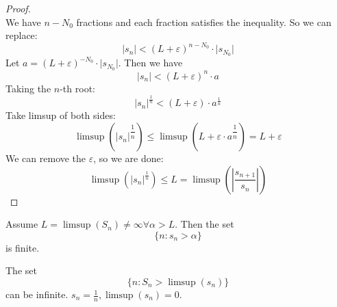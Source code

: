 \documentclass{report}
\begin{document}
\begin{proof}
\begin{equation*}
            \end{equation*}
        We have $n - N_{0}$ fractions and each fraction satisfies the inequality. So we can replace:
            \begin{equation*}
                \lvert s_{n} \rvert < (L + \varepsilon)^{n - N_{0}} \cdot \lvert s_{N_{0}} \rvert
            \end{equation*}
        Let $a = (L + \varepsilon)^{-N_{0}} \cdot \lvert s_{N_{0}} \rvert$. Then we have
            \begin{equation*}
                \lvert s_{n} \rvert < (L + \varepsilon)^{n} \cdot a
            \end{equation*}
        Taking the $n$-th root:
            \begin{equation*}
                \lvert s_{n} \rvert^{\frac{1}{n}} < (L + \varepsilon) \cdot a^{\frac{1}{n}}
            \end{equation*}
        Take limsup of both sides:
            \begin{equation*}
                \limsup(\lvert s_{n} \rvert^{\dfrac{1}{n}}) \leq \limsup(L + \varepsilon \cdot a^{\dfrac{1}{n}}) = L + \varepsilon
            \end{equation*}
        We can remove the $\varepsilon$, so we are done:
            \begin{equation*}
                \limsup(\lvert s_{n} \rvert^{\frac{1}{n}}) \leq L = \limsup(\left\lvert \dfrac{s_{n+ 1}}{s_{n}} \right\rvert)
            \end{equation*}
    \end{proof}

\begin{examples}
    \begin{example}
        Assume $L = \limsup(S_{n}) \neq \infty \forall \alpha > L$. Then the set 
            \begin{equation*}
                \{n : s_{n} > \alpha\}
            \end{equation*}
        is finite.
    \end{example}
    \begin{example}
        The set 
            \begin{equation*}
                \{n : S_{n} > \limsup(s_{n})\}
            \end{equation*}
        can be infinite. $s_{n} = \frac{1}{n}, \limsup(s_{n}) =0$.
    \end{example}
\end{examples}
\end{document}
